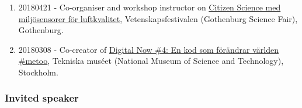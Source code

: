 \documentclass[
]{article}
\providecommand{\tightlist}{%
  \setlength{\itemsep}{0pt}\setlength{\parskip}{0pt}}
\begin{document}
\begin{enumerate}
\def\labelenumi{\arabic{enumi}.}
\tightlist
\item
  20180421 - Co-organiser and workshop instructor on
  \href{http://vetenskapsfestivalen.se/wp-content/uploads/2018/04/Vetenskapsfestivalen-\%C3\%96ppna-programmet-2018.pdf}{Citizen
  Science med miljösensorer för luftkvalitet}, Vetenskapsfestivalen
  (Gothenburg Science Fair), Gothenburg.
\item
  20180308 - Co-creator of
  \href{https://www.tekniskamuseet.se/pa-gang/invigning-digital-now-4-en-kod-som-forandrar-varlden-metoo/}{Digital
  Now \#4: En kod som förändrar världen \#metoo}, Tekniska muséet
  (National Museum of Science and Technology), Stockholm.
\end{enumerate}

\hypertarget{invited-speaker}{%
\subsubsection{Invited speaker}\label{invited-speaker}}
\end{document}
